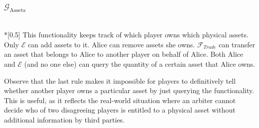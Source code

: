 \subsubsection{$\mathcal{G}_{\mathrm{Assets}}$} \ \\*[0.5\baselineskip]
  This functionality keeps track of which player owns which physical assets. Only
  $\mathcal{E}$ can add assets to it. Alice can remove assets she owns.
  $\mathcal{F}_{Trade}$ can transfer an asset that belongs to Alice to another player on
  behalf of Alice.  Both Alice and $\mathcal{E}$ (and no one else) can query the quantity
  of a certain asset that Alice owns.

  Observe that the last rule makes it impossible for players to definitively tell whether
  another player owns a particular asset by just querying the functionality. This is
  useful, as it reflects the real-world situation where an arbiter cannot decide who of
  two disagreeing players is entitled to a physical asset without additional information
  by third parties.
